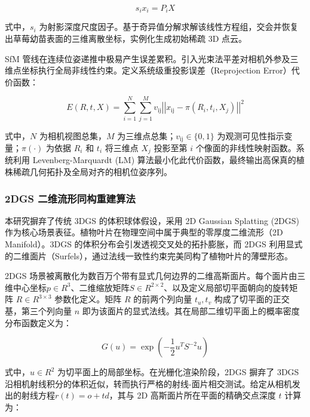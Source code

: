 \documentclass[preprint,12pt]{elsarticle}
\begin{document}
\begin{equation}
{s}_{i}{x}_{i}={P}_{i}X
\end{equation}

式中，${s}_{i}$ 为射影深度尺度因子。基于奇异值分解求解该线性方程组，交会并恢复出草莓幼苗表面的三维离散坐标，实例化生成初始稀疏 3D 点云。

SfM 管线在连续位姿递推中极易产生误差累积。引入光束法平差对相机外参及三维点坐标执行全局非线性约束。定义系统级重投影误差（Reprojection Error）代价函数：

\begin{equation}
E\left(R,t,X\right)=\sum_{i=1}^{N} \sum_{j=1}^{M} {v}_{\mathrm{ij}}{\left|\left|{x}_{\mathrm{ij}}-\pi\left({R}_{i},{t}_{i},{X}_{j}\right)\right|\right|}^{2}
\end{equation}

式中，$N$ 为相机视图总集，$M$ 为三维点总集；${v}_{\mathrm{ij}}\in \{0,1\}$ 为观测可见性指示变量；$\pi\left(\cdot\right)$ 为依据 ${R}_{i}$ 和 ${t}_{i}$ 将三维点 ${X}_{j}$ 投影至第 $i$ 个像面的非线性映射函数。系统利用 Levenberg-Marquardt (LM) 算法最小化此代价函数，最终输出高保真的植株稀疏几何拓扑及全局对齐的相机位姿序列。

\subsubsection{2DGS 二维流形同构重建算法}

本研究摒弃了传统 3DGS 的体积球体假设，采用 2D Gaussian Splatting (2DGS) 作为核心场景表征。植物叶片在物理空间中属于典型的零厚度二维流形（2D Manifold）。3DGS 的体积分布会引发透视交叉处的拓扑膨胀，而 2DGS 利用显式的二维面片（Surfels），通过法线一致性约束完美同构了植物叶片的薄壁形态。

2DGS 场景被离散化为数百万个带有显式几何边界的二维高斯面片。每个面片由三维中心坐标$p\in{R}^{3}$、二维缩放矩阵$S\in{R}^{2\times2}$、以及定义局部切平面朝向的旋转矩阵 $R\in{R}^{3\times3}$ 参数化定义。矩阵 $R$ 的前两个列向量 ${t}_{u},{t}_{v}$ 构成了切平面的正交基，第三个列向量 $n$ 即为该面片的显式法线。其在局部二维切平面上的概率密度分布函数定义为：

\begin{equation}
G\left(u\right)=\exp\left(-\frac{1}{2}{u}^{T}{S}^{-2}u\right)
\end{equation}

式中，$u\in{R}^{2}$ 为切平面上的局部坐标。在光栅化渲染阶段，2DGS 摒弃了 3DGS 沿相机射线积分的体积近似，转而执行严格的射线-面片相交测试。给定从相机发出的射线方程$r\left(t\right)=o+td$，其与 2D 高斯面片所在平面的精确交点深度 $t$ 计算为：
\end{document}

